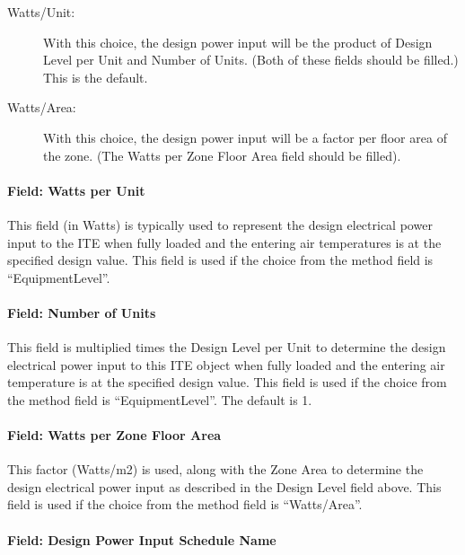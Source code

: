 \begin{description}
	\item[Watts/Unit:] With this choice, the design power input will be the product of Design Level per Unit and Number of Units. (Both of these fields should be filled.) This is the default.
	
	\item[Watts/Area:] With this choice, the design power input will be a factor per floor area of the zone. (The Watts per Zone Floor Area field should be filled).
\end{description}

\paragraph{Field: Watts per Unit}\label{field-watts-per-unit}

This field (in Watts) is typically used to represent the design electrical power input to the ITE when fully loaded and the entering air temperatures is at the specified design value. This field is used if the choice from the method field is ``EquipmentLevel''.

\paragraph{Field: Number of Units}\label{field-number-of-units}

This field is multiplied times the Design Level per Unit to determine the design electrical power input to this ITE object when fully loaded and the entering air temperature is at the specified design value. This field is used if the choice from the method field is ``EquipmentLevel''. The default is 1.

\paragraph{Field: Watts per Zone Floor Area}\label{field-watts-per-zone-floor-area-2}

This factor (Watts/m2) is used, along with the Zone Area to determine the design electrical power input as described in the Design Level field above. This field is used if the choice from the method field is ``Watts/Area''.

\paragraph{Field: Design Power Input Schedule Name}\label{field-design-power-input-schedule-name}

